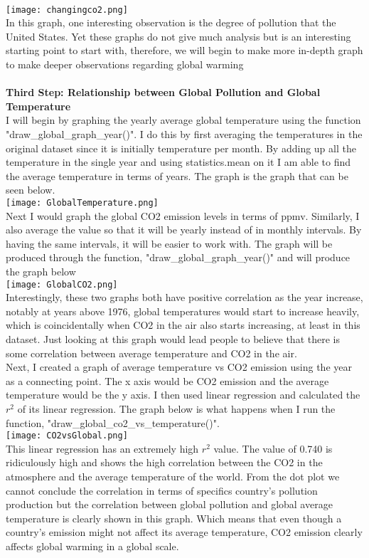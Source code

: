 \documentclass[fontsize=11pt]{article}
\begin{document}
\\
\texttt{[image: changingco2.png]}
\\
In this graph, one interesting observation is the degree of pollution that the United States. Yet these graphs do not give much analysis but is an interesting starting point to start with, therefore, we will begin to make more in-depth graph to make deeper observations regarding global warming
\\\\
\textbf{Third Step: Relationship between Global Pollution and Global Temperature}\\
I will begin by graphing the yearly average global temperature using the function "draw\_global\_graph\_year()". I do this by first averaging the temperatures in the original dataset since it is initially temperature per month. By adding up all the temperature in the single year and using statistics.mean on it I am able to find the average temperature in terms of years. The graph is the graph that can be seen below.
\\
\texttt{[image: GlobalTemperature.png]}
\\
Next I would graph the global CO2 emission levels in terms of ppmv. Similarly, I also average the value so that it will be yearly instead of in monthly intervals. By having the same intervals, it will be easier to work with. The graph will be produced through the function, "draw\_global\_graph\_year()" and will produce the graph below
\\
\texttt{[image: GlobalCO2.png]}
\\
Interestingly, these two graphs both have positive correlation as the year increase, notably at years above 1976, global temperatures would start to increase heavily, which is coincidentally when CO2 in the air also starts increasing, at least in this dataset. Just looking at this graph would lead people to believe that there is some correlation between average temperature and CO2 in the air.
\\
Next, I created a graph of average temperature vs CO2 emission using the year as a connecting point. The x axis would be CO2 emission and the average temperature would be the y axis. I then used linear regression and calculated the $r^2$ of its linear regression. The graph below is what happens when I run the function, "draw\_global\_co2\_vs\_temperature()".
\\
\texttt{[image: CO2vsGlobal.png]}
\\
This linear regression has an extremely high $r^2$ value. The value of 0.740 is ridiculously high and shows the high correlation between the CO2 in the atmosphere and the average temperature of the world. From the dot plot we cannot conclude the correlation in terms of specifics country's pollution production but the correlation between global pollution and global average temperature is clearly shown in this graph. Which means that even though a country's emission might not affect its average temperature, CO2 emission clearly affects global warming in a global scale.
\end{document}
